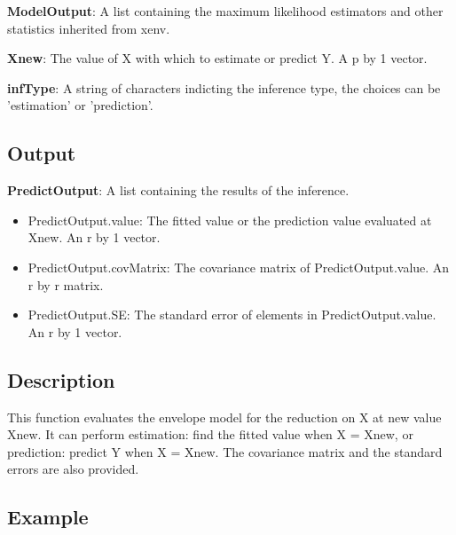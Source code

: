 \documentclass[a4paper,11pt,openany]{memoir}
\begin{document}
\begin{par}
\textbf{ModelOutput}: A list containing the maximum likelihood estimators and other statistics inherited from xenv.
\end{par} \vspace{1em}
\begin{par}
\textbf{Xnew}: The value of X with which to estimate or predict Y.  A p by 1 vector.
\end{par} \vspace{1em}
\begin{par}
\textbf{infType}: A string of characters indicting the inference type, the choices can be 'estimation' or 'prediction'.
\end{par} \vspace{1em}


\subsection*{Output}

\begin{par}
\textbf{PredictOutput}: A list containing the results of the inference.
\end{par} \vspace{1em}
\begin{itemize}
\setlength{\itemsep}{-1ex}
   \item PredictOutput.value: The fitted value or the prediction value evaluated at Xnew. An r by 1 vector.
   \item PredictOutput.covMatrix: The covariance matrix of PredictOutput.value. An r by r matrix.
   \item PredictOutput.SE: The standard error of elements in PredictOutput.value. An r by 1 vector.
\end{itemize}


\subsection*{Description}

\begin{par}
This function evaluates the envelope model for the reduction on X at new value Xnew.  It can perform estimation: find the fitted value when X = Xnew, or prediction: predict Y when X = Xnew.  The covariance matrix and the standard errors are also provided.
\end{par} \vspace{1em}


\subsection*{Example}
\end{document}
